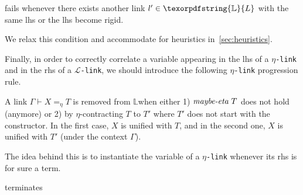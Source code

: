 \documentclass[sigconf,natbib=false,review]{acmart}
\newcommand{\llambda}{\ensuremath{\mathcal{L}}\xspace}
\newcommand{\linkMacro}[1]{\ensuremath{#1}\texttt{-link}\xspace}
\newcommand{\linkbeta}{\linkMacro{\llambda}}
\newcommand{\linketa} {\linkMacro{\eta}}
\newcommand{\linketaM}[3]{\ensuremath{#1 \vdash #2 =_\eta #3}}
\newcommand{\lhs}{lhs\xspace}
\newcommand{\rhs}{rhs\xspace}
\newcommand{\linkStore}{\texorpdfstring{\ensuremath{\mathbb{L}}\xspace}{L}}
\begin{document}
\begin{definition}[\progBetaFail]
  \progress fails whenever
  there exists another link $l' \in \linkStore$ with the same \lhs %
  or the \lhs %
  become rigid.
  \label{def:progBetaFail}
\end{definition}

We relax this condition and accommodate for
heuristics in~\ref{sec:heuristics}.

Finally, in order to correctly correlate a variable appearing in the \lhs of a
\linketa and in the \rhs of a \linkbeta, we should introduce the following
\linketa progression rule.

\newcommand{\progressetaright}{\emph{$\eta$-progress-\rhs}\xspace}
\begin{definition}[\progressetaright]\label{def:progressetaright} A link
\linketaM{\Gamma}{X}{T} is removed from \linkStore when either 1)
$\emph{maybe-eta}~T$ does not hold (anymore) or 2) by $\eta$-contracting $T$ to
$T'$ where $T'$ does not start with the  constructor. In the
first case, $X$ is unified with $T$, and in the second one, $X$ is unified with
$T'$ (under the context $\Gamma$).
\end{definition}

The idea behind this is to instantiate the variable of a \linketa whenever its
\rhs is for sure a \wellb term.

\begin{lemma}
   terminates
\end{lemma}
\end{document}
